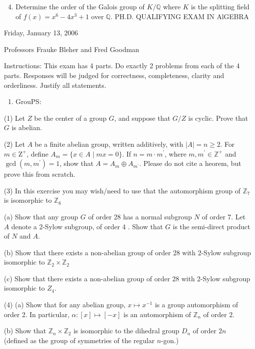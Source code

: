 \documentclass[10pt]{article}
\begin{document}
\begin{enumerate}
  \setcounter{enumi}{3}
  \item Determine the order of the Galois group of $K / \mathbb{Q}$ where $K$ is the splitting field of $f(x)=x^{6}-4 x^{3}+1$ over $\mathbb{Q} .$ PH.D. QUALIFYING EXAM IN AlGEBRA
\end{enumerate}
Friday, January 13, 2006

Professors Frauke Bleher and Fred Goodman

Instructions: This exam has 4 parts. Do exactly 2 problems from each of the 4 parts. Responses will be judged for correctness, completeness, clarity and orderliness. Justify all statements.

\begin{enumerate}
  \item GrouPS:
\end{enumerate}
(1) Let $Z$ be the center of a group $G$, and suppose that $G / Z$ is cyclic. Prove that $G$ is abelian.

(2) Let $A$ be a finite abelian group, written additively, with $|A|=n \geq 2$. For $m \in \mathrm{Z}^{+}$, define $A_{m}=\{x \in A \mid m x=0\}$. If $n=m \cdot m^{\prime}$, where $m, m^{\prime} \in \mathbb{Z}^{+}$ and $\operatorname{gcd}\left(m, m^{\prime}\right)=1$, show that $A=A_{m} \oplus A_{m^{\prime}}$. Please do not cite a heorem, but prove this from scratch.

(3) In this exercise you may wish/need to use that the automorphism group of $\mathbb{Z}_{7}$ is isomorphic to $\mathbb{Z}_{6}$

(a) Show that any group $G$ of order 28 has a normal subgroup $N$ of order 7. Let $A$ denote a 2-Sylow subgroup, of order 4 . Show that $G$ is the semi-direct product of $N$ and $A$.

(b) Show that there exists a non-abelian group of order 28 with 2-Sylow subgroup isomorphic to $\mathbb{Z}_{2} \times \mathbb{Z}_{2}$

(c) Show that there exists a non-abelian group of order 28 with 2-Sylow subgroup isomorphic to $Z_{4}$.

(4) (a) Show that for any abelian group, $x \mapsto x^{-1}$ is a group automorphism of order 2. In particular, $\alpha:[x] \mapsto[-x]$ is an automorphism of $\mathbb{Z}_{n}$ of order $2 .$

(b) Show that $\mathbb{Z}_{n} \times \mathbb{Z}_{2}$ is isomorphic to the dihedral group $D_{n}$ of order $2 n$ (defined as the group of symmetries of the regular $n$-gon.)
\end{document}
